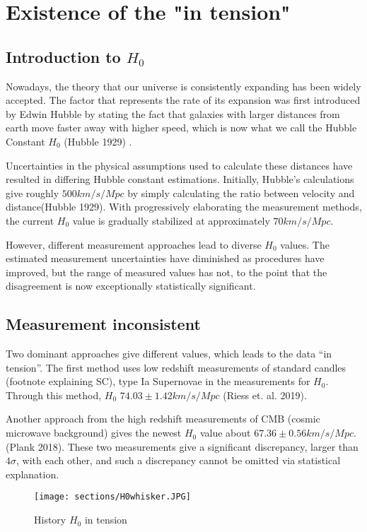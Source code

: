 \section{Existence of the "in tension"} \label{sec:outline}
\subsection{\label{sec:level2}Introduction to $H_0$}
Nowadays, the theory that our universe is consistently expanding has been widely accepted. The factor that represents the rate of its expansion was first introduced by Edwin Hubble by stating the fact that galaxies with larger distances from earth move faster away with higher speed, which is now what we call the Hubble Constant $H_0$ (Hubble 1929) \cite{H1929}. 

 Uncertainties in the physical assumptions used to calculate these distances have resulted in differing Hubble constant estimations. Initially, Hubble’s calculations give roughly $500 km/s/Mpc$ by simply calculating the ratio between velocity and distance(Hubble 1929)\cite{H1929}. With progressively elaborating the measurement methods, the current $H_0$ value is gradually stabilized at approximately $70 km/s/Mpc$. 

However, different measurement approaches lead to diverse $H_0$ values. The estimated measurement uncertainties have diminished as procedures have improved, but the range of measured values has not, to the point that the disagreement is now exceptionally statistically significant.


\subsection{\label{sec:level2}Measurement inconsistent}
Two dominant approaches give different values, which leads to the data “in tension”. The first method uses low redshift measurements of standard candles (footnote explaining SC), type Ia Supernovae in the measurements for $H_0$. Through this method, $H_0$  $74.03 \pm 1.42 km/s/Mpc$  (Riess et. al. 2019).

Another approach from the high redshift measurements of CMB (cosmic microwave background) gives the newest $H_0$ value about $67.36 \pm 0.56km/s/Mpc$. (Plank 2018). These two measurements give a significant discrepancy, larger than $4 \sigma$, with each other, and such a discrepancy cannot be omitted via statistical explanation.

\begin{figure}
    \centering
    \texttt{[image: sections/H0whisker.JPG]}
    \caption{History $H_0$ in tension}
    \label{fig:hist_h0}
\end{figure}

